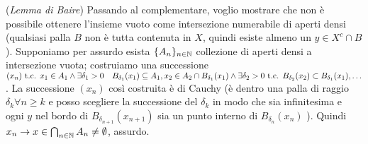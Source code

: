  ({\it Lemma di Baire}) Passando al complementare, voglio mostrare che non è possibile ottenere l'insieme vuoto come intersezione numerabile di aperti densi (qualsiasi palla $B$ non è tutta contenuta in $X$, quindi esiste almeno un $y \in X^c \cap B$). Supponiamo per assurdo esista $\{A_n\}_{n\in\mathbb{N}}$ collezione di aperti densi a intersezione vuota; costruiamo una successione $(x_n) \mbox{ t.c. } x_1 \in A_1 \wedge \exists \delta_1 > 0 \quad B_{\delta_1}(x_1) \subseteq A_1, x_2 \in A_2 \cap B_{\delta_1}(x_1) \wedge \exists \delta_2 > 0 \mbox{ t.c. } B_{\delta_2}(x_2) \subset B_{\delta_1}(x_1), \ldots $. La successione $(x_n)$ così costruita è di Cauchy (è dentro una palla di raggio $\delta_k \forall n \ge k$ e posso scegliere la successione del $\delta_k$ in modo che sia infinitesima e ogni $y$ nel bordo di $B_{\delta_{n+1}}(x_{n+1})$ sia un punto interno di $B_{\delta_n}(x_n)$ ). Quindi $x_n \rightarrow x \in \bigcap_{n\in\mathbb{N}} A_n\neq \emptyset$, assurdo.

